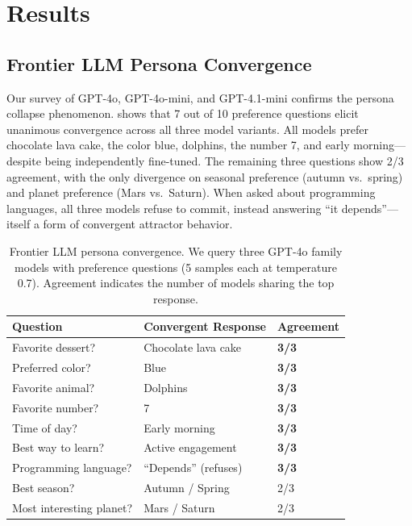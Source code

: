 \section{Results}
\label{sec:results}

\subsection{Frontier LLM Persona Convergence}
\label{sec:results_survey}

Our survey of GPT-4o, GPT-4o-mini, and GPT-4.1-mini confirms the persona collapse phenomenon.  shows that 7 out of 10 preference questions elicit unanimous convergence across all three model variants. All models prefer chocolate lava cake, the color blue, dolphins, the number 7, and early morning---despite being independently fine-tuned. The remaining three questions show 2/3 agreement, with the only divergence on seasonal preference (autumn vs.\ spring) and planet preference (Mars vs.\ Saturn). When asked about programming languages, all three models refuse to commit, instead answering ``it depends''---itself a form of convergent attractor behavior.

\begin{table}[t]
\centering
\caption{Frontier LLM persona convergence. We query three GPT-4o family models with preference questions (5 samples each at temperature 0.7). Agreement indicates the number of models sharing the top response.}
\label{tab:survey}
\begin{tabular}{@{}lll@{}}
\toprule
\textbf{Question} & \textbf{Convergent Response} & \textbf{Agreement} \\
\midrule
Favorite dessert? & Chocolate lava cake & \textbf{3/3} \\
Preferred color? & Blue & \textbf{3/3} \\
Favorite animal? & Dolphins & \textbf{3/3} \\
Favorite number? & 7 & \textbf{3/3} \\
Time of day? & Early morning & \textbf{3/3} \\
Best way to learn? & Active engagement & \textbf{3/3} \\
Programming language? & ``Depends'' (refuses) & \textbf{3/3} \\
Best season? & Autumn / Spring & 2/3 \\
Most interesting planet? & Mars / Saturn & 2/3 \\
\bottomrule
\end{tabular}
\end{table}

